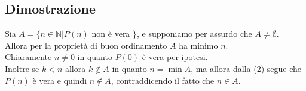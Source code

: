 \documentclass[a4paper,12pt]{article}
\begin{document}
\subsection*{Dimostrazione}
Sia $A = \{n \in \mathbb{N} | P(n)$ non è vera $\}$, e supponiamo per assurdo che $A \neq \emptyset$.\\
Allora per la proprietà di buon ordinamento $A$ ha minimo $n$.\\
Chiaramente $n \neq 0$ in quanto $P(0)$ è vera per ipotesi.\\
Inoltre se $k < n$ allora $k \notin A$ in quanto $n = \min A$, ma allora dalla (2) segue che $P(n)$ è vera e quindi $n \notin A$, contraddicendo il fatto che $n \in A$.

\printindex
\end{document}
